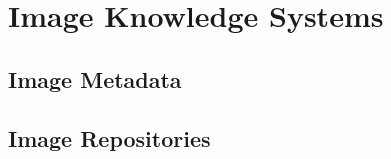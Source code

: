 
\chapter{Image Knowledge Systems} %

\label{Chapter2} %



\section{Image Metadata}


\section{Image Repositories}
